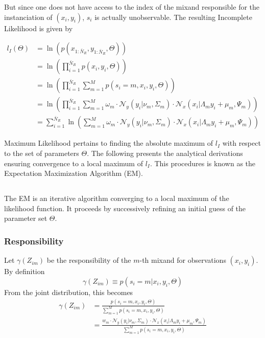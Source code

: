 But since one does not have access to the index of the mixand responsible for the instanciation of $(x_i,y_i)$, $s_i$ is actually unobservable. The resulting Incomplete Likelihood is given by

\begin{align}
l_I(\Theta)& = \ln\left(p(x_{1:\bar{N}_R},y_{1:\bar{N}_R},\Theta)\right)\nonumber\\
&=  \ln\left(\prod\limits_{i = 1}^{\bar{N}_R}p(x_i,y_i,\Theta)\right)\nonumber\\
&= \ln\left(\prod\limits_{i = 1}^{\bar{N}_R}\sum\limits_{m = 1}^{M}p(s_i = m,x_i,y_i,\Theta)\right)\nonumber\\
&= \ln\left(\prod\limits_{i = 1}^{\bar{N}_R}\sum\limits_{m = 1}^{M}\omega_m\cdot
\mathcal{N}_y\left(y_i\vert\nu_m,\Sigma_m\right)\cdot\mathcal{N}_x\left(x_i\vert\Lambda_my_i + \mu_m,\Psi_m\right)\right)\\
&=\sum\limits_{i = 1}^{\bar{N}_R}\ln\left(\sum\limits_{m = 1}^{M}\omega_m\cdot
\mathcal{N}_y\left(y_i\vert\nu_m,\Sigma_m\right)\cdot\mathcal{N}_x\left(x_i\vert\Lambda_my_i + \mu_m,\Psi_m\right)\right)
\end{align}

Maximum Likelihood pertains to finding the absolute maximum of $l_I$ with respect to the set of parameters $\Theta$. The following presents the analytical derivations ensuring convergence to a local maximum of $l_I$. This procedures is known as the Expectation Maximization Algorithm (EM).
\subsection{}
The EM is an iterative algorithm converging to a local maximum of the likelihood function. It proceeds by successively refining an initial guess of the parameter set $\Theta$. 

\subsubsection{Responsibility}
Let $\gamma(Z_{im})$ be the responsibility of the $m$-th mixand for observations $(x_i,y_i)$. By definition
\begin{equation}
 \gamma(Z_{im})\equiv p(s_i = m\vert x_i,y_i,\Theta)
\end{equation}
From the joint distribution, this becomes
\begin{align}
 \gamma(Z_{im})& = \frac{p(s_i = m, x_i, y_i, \Theta)}{\sum\limits_{m = 1}^{M}p(s_i = m, x_i, y_i, \Theta)}\\
 &=  \frac{w_{m}\cdot
\mathcal{N}_y\left(y_i\vert\nu_m,\Sigma_m\right)\cdot\mathcal{N}_x\left(x_i\vert\Lambda_my_i + \mu_m,\Psi_m\right)}{\sum\limits_{m = 1}^{M}p(s_i = m, x_i, y_i, \Theta)}
\end{align}

